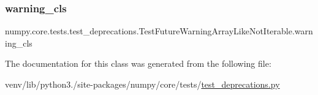 \subsubsection{\texorpdfstring{warning\+\_\+cls}{warning\_cls}}
{\footnotesize\ttfamily numpy.\+core.\+tests.\+test\+\_\+deprecations.\+Test\+Future\+Warning\+Array\+Like\+Not\+Iterable.\+warning\+\_\+cls\hspace{0.3cm}{\ttfamily [static]}}



The documentation for this class was generated from the following file\+:\begin{DoxyCompactItemize}
\item 
venv/lib/python3./site-\/packages/numpy/core/tests/\hyperlink{core_2tests_2test__deprecations_8py}{test\+\_\+deprecations.\+py}\end{DoxyCompactItemize}

